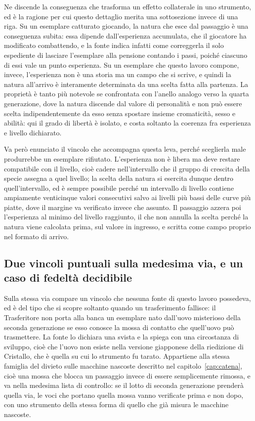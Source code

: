 Ne discende la conseguenza che trasforma un effetto collaterale in uno strumento, ed è la ragione per cui questo dettaglio merita una sottosezione invece di una riga. Su un esemplare catturato giocando, la natura che esce dal passaggio è una conseguenza subita: essa dipende dall'esperienza accumulata, che il giocatore ha modificato combattendo, e la fonte indica infatti come correggerla il solo espediente di lasciare l'esemplare alla pensione contando i passi, poiché ciascuno di essi vale un punto esperienza. Su un esemplare che questo lavoro compone, invece, l'esperienza non è una storia ma un campo che si scrive, e quindi la natura all'arrivo è interamente determinata da una scelta fatta alla partenza. La proprietà è tanto più notevole se confrontata con l'anello analogo verso la quarta generazione, dove la natura discende dal valore di personalità e non può essere scelta indipendentemente da esso senza spostare insieme cromaticità, sesso e abilità: qui il grado di libertà è isolato, e costa soltanto la coerenza fra esperienza e livello dichiarato.

Va però enunciato il vincolo che accompagna questa leva, perché sceglierla male produrrebbe un esemplare rifiutato. L'esperienza non è libera ma deve restare compatibile con il livello, cioè cadere nell'intervallo che il gruppo di crescita della specie assegna a quel livello; la scelta della natura si esercita dunque dentro quell'intervallo, ed è sempre possibile perché un intervallo di livello contiene ampiamente venticinque valori consecutivi salvo ai livelli più bassi delle curve più piatte, dove il margine va verificato invece che assunto. Il passaggio azzera poi l'esperienza al minimo del livello raggiunto, il che non annulla la scelta perché la natura viene calcolata prima, sul valore in ingresso, e scritta come campo proprio nel formato di arrivo.

\subsection{Due vincoli puntuali sulla medesima via, e un caso di fedeltà decidibile}

Sulla stessa via compare un vincolo che nessuna fonte di questo lavoro possedeva, ed è del tipo che si scopre soltanto quando un trasferimento fallisce: il Trasferitore non porta alla banca un esemplare nato dall'uovo misterioso della seconda generazione se esso conosce la mossa di contatto che quell'uovo può trasmettere. La fonte lo dichiara una svista e la spiega con una circostanza di sviluppo, cioè che l'uovo non esiste nella versione giapponese della riedizione di Cristallo, che è quella su cui lo strumento fu tarato. Appartiene alla stessa famiglia del divieto sulle macchine nascoste descritto nel capitolo~\ref{cap:catena}, cioè una mossa che blocca un passaggio invece di essere semplicemente rimossa, e va nella medesima lista di controllo: se il lotto di seconda generazione prenderà quella via, le voci che portano quella mossa vanno verificate prima e non dopo, con uno strumento della stessa forma di quello che già misura le macchine nascoste.

